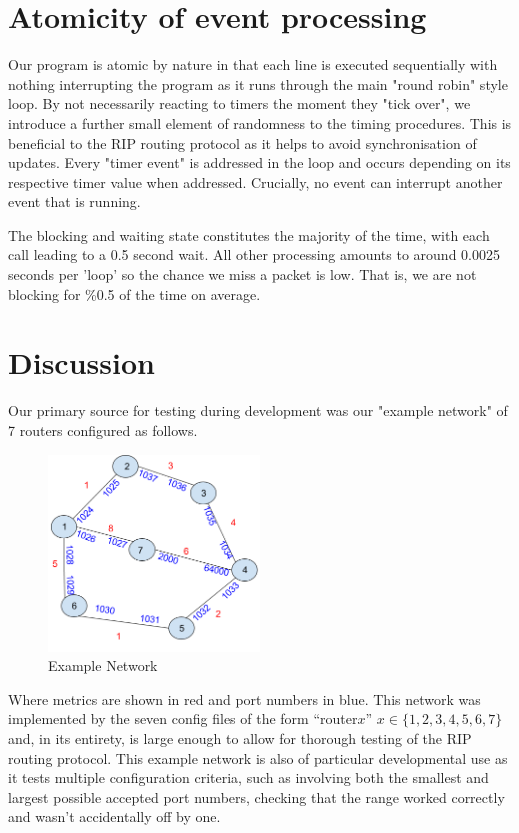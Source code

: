\documentclass[12pt,twoside]{article}
\begin{document}
\section{Atomicity of event processing}

Our program is atomic by nature in that each line is executed sequentially with nothing interrupting the program as it runs through the main "round robin" style loop. By not necessarily reacting to timers the moment they "tick over", we introduce a further small element of randomness to the timing procedures. This is beneficial to the RIP routing protocol as it helps to avoid synchronisation of updates. Every "timer event" is addressed in the loop and occurs depending on its respective timer value when addressed. Crucially, no event can interrupt another event that is running.

The blocking and waiting state constitutes the majority of the time, with each call leading to a 0.5 second wait. All other processing amounts to around 0.0025 seconds  per 'loop' so the chance we miss a packet is low. That is, we are not blocking for \%0.5 of the time on average. %

\section{Discussion}
Our primary source for testing during development was our "example network" of 7 routers configured as follows.

\begin{figure}[htpb]
	\centering
	\includegraphics[width=0.5\textwidth]{Topology_Pic.png} %
	\caption{Example Network}
\end{figure}%



Where metrics are shown in red and port numbers in blue. This network was implemented by the seven config files of the form “router$x$” $x\in \{1,2,3,4,5,6,7\}$ and, in its entirety, is large enough to allow for thorough testing of the RIP routing protocol. This example network is also of particular developmental use as it tests multiple configuration criteria, such as involving both the smallest and largest possible accepted port numbers, checking that the range worked correctly and wasn’t accidentally off by one.
\end{document}
